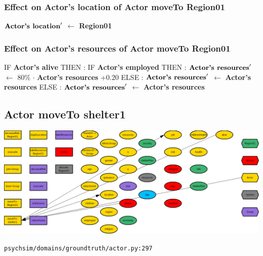\documentclass{article}%
\begin{document}
%
\subsubsection{Effect on Actor's location of Actor moveTo Region01}%
\label{ssubsec:Effect on Actor's location of Actor moveTo Region01}%
\begin{flushleft}%
$\mbox{\textbf{Actor's location}} '$%
$\leftarrow$%
\textbf{Region01}%
\end{flushleft}

%
\subsubsection{Effect on Actor's resources of Actor moveTo Region01}%
\label{ssubsec:Effect on Actor's resources of Actor moveTo Region01}%
\begin{flushleft}%
IF %
\textbf{Actor's alive}%
\linebreak%
\hspace*{2em}%
THEN %
: %
IF %
\textbf{Actor's employed}%
\linebreak%
\hspace*{4em}%
THEN %
: %
$\mbox{\textbf{Actor's resources}} '$%
$\leftarrow$%
80\%%
$\cdot$%
\textbf{Actor's resources}%
+0.20%
\linebreak%
\hspace*{4em}%
ELSE %
: %
$\mbox{\textbf{Actor's resources}} '$%
$\leftarrow$%
\textbf{Actor's resources}%
\linebreak%
\hspace*{2em}%
ELSE %
: %
$\mbox{\textbf{Actor's resources}} '$%
$\leftarrow$%
\textbf{Actor's resources}%
\end{flushleft}

%
\subsection{Actor moveTo shelter1}%
\label{subsec:Actor moveTo shelter1}%
\includegraphics[width=\textwidth]{images/Actor-moveTo-shelter1.png}%
\begin{flushleft}%
\verb|psychsim/domains/groundtruth/actor.py:297|%
\end{flushleft}%
\end{document}
